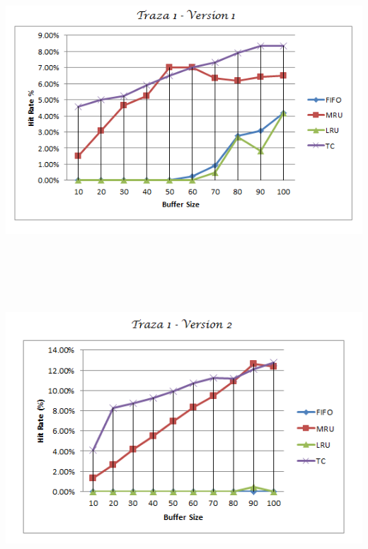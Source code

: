 \begin{center}
  \includegraphics[height=11cm]{img/T1V1.png}
\end{center}  
\begin{center}
  \includegraphics[height=11cm]{img/T1V2.png}
\end{center}  
